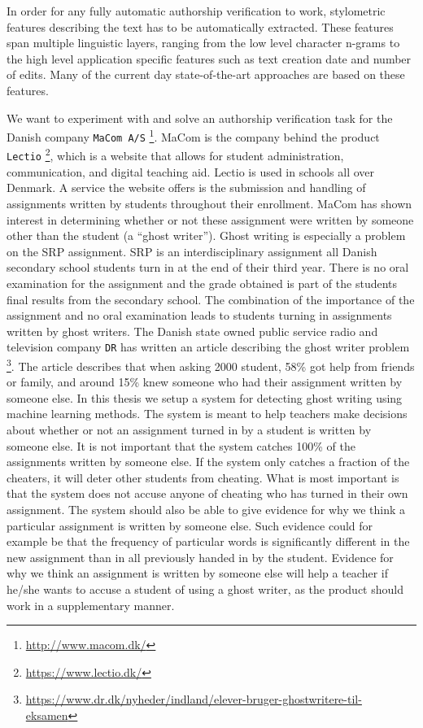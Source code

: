 In order for any fully automatic authorship verification to work, stylometric
features describing the text has to be automatically extracted. These features
span multiple linguistic layers, ranging from the low level character n-grams
to the high level application specific features such as text creation date and
number of edits. Many of the current day state-of-the-art approaches are based
on these features.


We want to experiment with and solve an authorship verification task for the
Danish company \texttt{MaCom A/S} \footnote{\url{http://www.macom.dk/}}.
MaCom is the company behind the product \texttt{Lectio}
\footnote{\url{https://www.lectio.dk/}}, which is a website that allows for
student administration, communication, and digital teaching aid. Lectio is used
in schools all over Denmark. A service the website offers is the submission
and handling of assignments written by students throughout their enrollment.
MaCom has shown interest in determining whether or not these assignment
were written by someone other than the student (a ``ghost writer''). Ghost
writing is especially a problem on the \gls{SRP} assignment. \gls{SRP} is
an interdisciplinary assignment all Danish secondary school students turn
in at the end of their third year. There is no oral examination for the
assignment and the grade obtained is part of the students final results from
the secondary school. The combination of the importance of the assignment
and no oral examination leads to students turning in assignments written by
ghost writers. The Danish state owned public service radio and television
company \texttt{DR} has written an article describing the ghost writer problem
\footnote{\url{https://www.dr.dk/nyheder/indland/elever-bruger-ghostwritere-til-
eksamen}}. The article describes that when asking 2000 student, 58\% got help
from friends or family, and around 15\% knew someone who had their assignment
written by someone else. In this thesis we setup a system for detecting ghost
writing using machine learning methods. The system is meant to help teachers
make decisions about whether or not an assignment turned in by a student is
written by someone else. It is not important that the system catches 100\% of
the assignments written by someone else. If the system only catches a fraction
of the cheaters, it will deter other students from cheating. What is most
important is that the system does not accuse anyone of cheating who has turned
in their own assignment. The system should also be able to give evidence for why
we think a particular assignment is written by someone else. Such evidence could
for example be that the frequency of particular words is significantly different
in the new assignment than in all previously handed in by the student. Evidence
for why we think an assignment is written by someone else will help a teacher if
he/she wants to accuse a student of using a ghost writer, as the product should
work in a supplementary manner.

